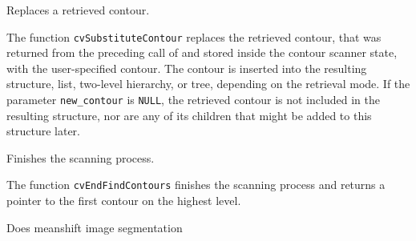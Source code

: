 Replaces a retrieved contour.


\begin{description}
\end{description}

The function \texttt{cvSubstituteContour} replaces the retrieved
contour, that was returned from the preceding call of
 and stored inside the contour scanner
state, with the user-specified contour. The contour is inserted
into the resulting structure, list, two-level hierarchy, or tree,
depending on the retrieval mode. If the parameter \texttt{new\_contour}
is \texttt{NULL}, the retrieved contour is not included in the
resulting structure, nor are any of its children that might be added
to this structure later.

\label{EndFindContours}

Finishes the scanning process.


\begin{description}
\end{description}

The function \texttt{cvEndFindContours} finishes the scanning process and returns a pointer to the first contour on the highest level.
\fi


Does meanshift image segmentation


